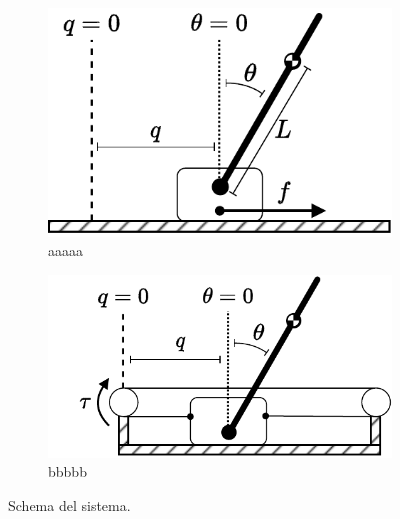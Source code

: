 \begin{figure}
    \centering
    \begin{subfigure}[b]{0.4\textwidth}
        \centering
        \includegraphics[width=\textwidth]{assets/pic}
        \caption{aaaaa}
        \label{fig:pic}
    \end{subfigure}
    \hfill
    \begin{subfigure}[b]{0.48\textwidth}
        \centering
        \includegraphics[width=\textwidth]{assets/pic-real}
        \caption{bbbbb}
        \label{fig:pic-real}
    \end{subfigure}
    \caption{Schema del sistema.} %
\end{figure}
